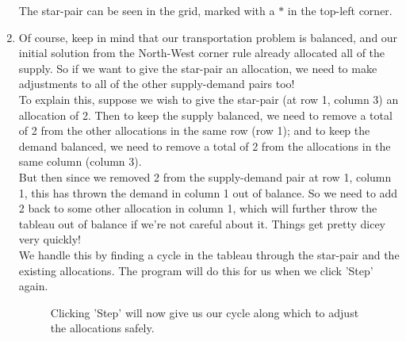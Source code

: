 \documentclass[a4paper,12pt]{article}
\begin{document}
\begin{enumerate}
The star-pair can be seen in the grid, marked with a $*$ in the top-left corner.\\

\newpage

\item
Of course, keep in mind that our transportation problem is balanced, and our initial solution from the North-West corner rule already allocated all of the supply. So if we want to give the star-pair an allocation, we need to make adjustments to all of the other supply-demand pairs too!\\

To explain this, suppose we wish to give the star-pair (at row 1, column 3) an allocation of 2. Then to keep the supply balanced, we need to remove a total of 2 from the other allocations in the same row (row 1); and to keep the demand balanced, we need to remove a total of 2 from the allocations in the same column (column 3).\\

But then since we removed 2 from the supply-demand pair at row 1, column 1, this has thrown the demand in column 1 out of balance. So we need to add 2 back to some other allocation in column 1, which will further throw the tableau out of balance if we're not careful about it. Things get pretty dicey very quickly!\\

We handle this by finding a cycle in the tableau through the star-pair and the existing allocations. The program will do this for us when we click 'Step' again.

\begin{figure}[h!]
\centering
{}
\caption{Clicking 'Step' will now give us our cycle along which to adjust the allocations safely.}
\end{figure} 


\end{enumerate}
\end{document}
